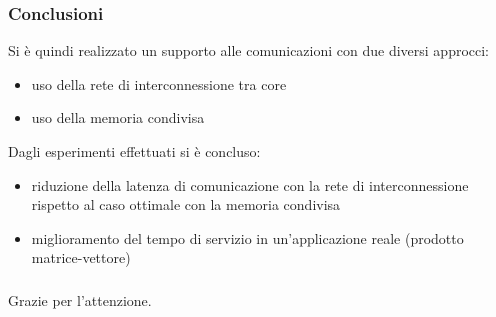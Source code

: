 \documentclass{beamer}
\begin{document}

\begin{frame}
  \frametitle{Conclusioni}
  Si \`e quindi realizzato un supporto alle comunicazioni con due diversi approcci:
  \begin{itemize}
  \item uso della rete di interconnessione tra core
  \item uso della memoria condivisa
  \end{itemize}
  \vspace{4mm}
  Dagli esperimenti effettuati si \`e concluso:
  \begin{itemize}
  \item riduzione della latenza di comunicazione con la rete di interconnessione rispetto al caso ottimale con la memoria condivisa
  \item miglioramento del tempo di servizio in un'applicazione reale (prodotto matrice-vettore)
  \end{itemize}
\end{frame}

\begin{frame}
  \frametitle{}
  \vspace{.8cm}
  \begin{center}
    Grazie per l'attenzione.
  \end{center}
\end{frame}
\end{document}
